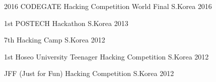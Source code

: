 

\begin{cvhonours}

	{2016 CODEGATE Hacking Competition World Final} %
	{S.Korea} %
	{2016} %

	{1st POSTECH Hackathon} %
	{S.Korea} %
	{2013} %

	{7th Hacking Camp} %
	{S.Korea} %
	{2012} %

	{1st Hoseo University Teenager Hacking Competition} %
	{S.Korea} %
	{2012} %

	{JFF (Just for Fun) Hacking Competition} %
	{S.Korea} %
	{2012} %

\end{cvhonours}
